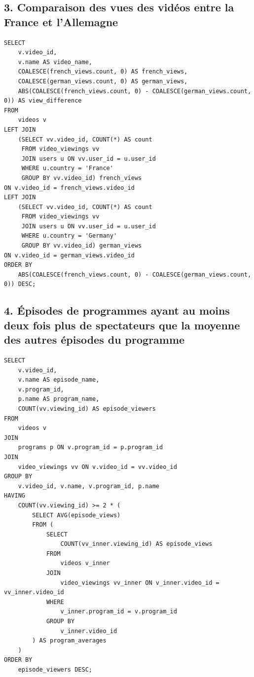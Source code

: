 \documentclass[a4paper, 12pt]{article}
\begin{document}
\subsection*{3. Comparaison des vues des vidéos entre la France et l'Allemagne}

\begin{lstlisting}
SELECT 
    v.video_id,
    v.name AS video_name,
    COALESCE(french_views.count, 0) AS french_views,
    COALESCE(german_views.count, 0) AS german_views,
    ABS(COALESCE(french_views.count, 0) - COALESCE(german_views.count, 0)) AS view_difference
FROM 
    videos v
LEFT JOIN 
    (SELECT vv.video_id, COUNT(*) AS count
     FROM video_viewings vv
     JOIN users u ON vv.user_id = u.user_id
     WHERE u.country = 'France'
     GROUP BY vv.video_id) french_views 
ON v.video_id = french_views.video_id
LEFT JOIN 
    (SELECT vv.video_id, COUNT(*) AS count
     FROM video_viewings vv
     JOIN users u ON vv.user_id = u.user_id
     WHERE u.country = 'Germany'
     GROUP BY vv.video_id) german_views 
ON v.video_id = german_views.video_id
ORDER BY 
    ABS(COALESCE(french_views.count, 0) - COALESCE(german_views.count, 0)) DESC;
\end{lstlisting}

\subsection*{4. Épisodes de programmes ayant au moins deux fois plus de spectateurs que la moyenne des autres épisodes du programme}

\begin{lstlisting}
SELECT 
    v.video_id,
    v.name AS episode_name,
    v.program_id,
    p.name AS program_name,
    COUNT(vv.viewing_id) AS episode_viewers
FROM 
    videos v
JOIN 
    programs p ON v.program_id = p.program_id
JOIN 
    video_viewings vv ON v.video_id = vv.video_id
GROUP BY 
    v.video_id, v.name, v.program_id, p.name
HAVING 
    COUNT(vv.viewing_id) >= 2 * (
        SELECT AVG(episode_views)
        FROM (
            SELECT 
                COUNT(vv_inner.viewing_id) AS episode_views
            FROM 
                videos v_inner
            JOIN 
                video_viewings vv_inner ON v_inner.video_id = vv_inner.video_id
            WHERE 
                v_inner.program_id = v.program_id
            GROUP BY 
                v_inner.video_id
        ) AS program_averages
    )
ORDER BY 
    episode_viewers DESC;
\end{lstlisting}
\end{document}
